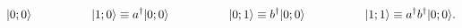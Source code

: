 \begin{equation}
\label{twentysix}
|0;0 \rangle \hspace{0.7in}
|1;0 \rangle \equiv a^{\dagger}|0;0 \rangle \hspace{0.7in}
|0;1 \rangle \equiv b^{\dagger}|0;0 \rangle \hspace{0.7in}
|1;1 \rangle \equiv a^{\dagger}b^{\dagger}|0;0 \rangle. 
\end{equation}


